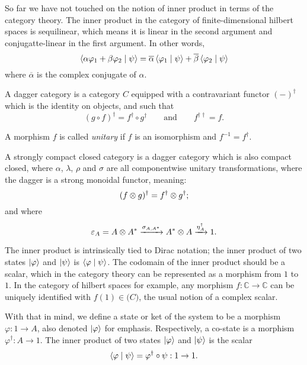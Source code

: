 So far we have not touched on the notion of inner product in terms of the category theory.
The inner product in the category of finite-dimensional hilbert spaces is sequilinear,
which means it is linear in the second argument and conjugatte-linear in the first argument.
In other words,
\[ \Braket{\alpha \varphi_1 + \beta \varphi_2 \mid \psi} 
   = \overline{\alpha} \Braket{\varphi_1 \mid \psi} + \overline{\beta} \Braket{\varphi_2 \mid \psi}
\]
where $\overline{\alpha}$ is the complex conjugate of $\alpha$.


\begin{definition}
    A dagger category is a category $C$ equipped with a contravariant functor $(-)^\dagger$ 
    which is the identity on objects, and such that 
    \[ (g \circ f)^\dagger = f^\dagger \circ g^\dagger \qquad\text{and}\qquad f^{\dagger\dagger} = f. \]
\end{definition}

A morphism $f$ is called \emph{unitary} if $f$ is an isomorphism and $f^{-1}=f^\dagger$.

\begin{definition}
    A strongly compact closed category is a dagger category which is also compact closed,
    where $\alpha$, $\lambda$, $\rho$ and $\sigma$ are all componentwise unitary transformations,
    where the dagger is a strong monoidal functor, meaning:
    \[ (f \otimes g)^\dagger = f^\dagger \otimes g^\dagger; \]
    and where
    \[ \varepsilon_A = A \otimes A^*
        \xrightarrow{\sigma_{A,A^*}} A^* \otimes A
        \xrightarrow{\eta_A^\dagger} 1.
    \]
\end{definition}

The inner product is intrinsically tied to Dirac notation; the inner product of two states
$\Ket{\varphi}$ and $\Ket{\psi}$ is $\Braket{\varphi \mid \psi}$. The codomain of the inner product
should be a scalar, which in the category theory can be represented as a morphism from $1$ to $1$.
In the category of hilbert spaces for example, any morphism $f : \mathbb{C} \rightarrow \mathbb{C}$
can be uniquely identified with $f(1) \in \mathbb(C)$, the usual notion of a complex scalar.

With that in mind, we define a state or ket of the system to be a morphism $\varphi : 1 \rightarrow A$,
also denoted $\Ket{\varphi}$ for emphasis. Respectively, a co-state is a morphism
$\varphi^\dagger : A \rightarrow 1$. The inner product of two states $\Ket{\varphi}$ and $\Ket{\psi}$
is the scalar
\[ \Braket{\varphi \mid \psi} = \varphi^\dagger \circ \psi : 1 \rightarrow 1. \]

